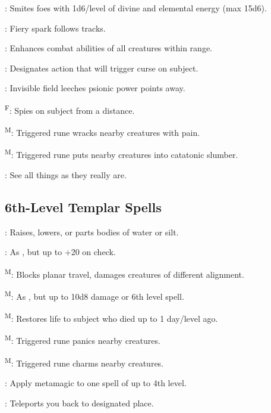 : Smites foes with 1d6/level of divine and elemental energy (max 15d6).

: Fiery spark follows tracks.

: Enhances combat abilities of all creatures within range.

: Designates action that will trigger curse on subject.

: Invisible field leeches psionic power points away.

\textsuperscript{F}: Spies on subject from a distance.

\textsuperscript{M}: Triggered rune wracks nearby creatures with pain.

\textsuperscript{M}: Triggered rune puts nearby creatures into catatonic slumber.

: See all things as they really are.



\subsection{6th-Level Templar Spells}

: Raises, lowers, or parts bodies of water or silt.

: As , but up to +20 on check.

\textsuperscript{M}: Blocks planar travel, damages creatures of different alignment.

\textsuperscript{M}: As , but up to 10d8 damage or 6th level spell.

\textsuperscript{M}: Restores life to subject who died up to 1 day/level ago.

\textsuperscript{M}: Triggered rune panics nearby creatures.

\textsuperscript{M}: Triggered rune charms nearby creatures.

: Apply metamagic to one spell of up to 4th level.

: Teleports you back to designated place.



